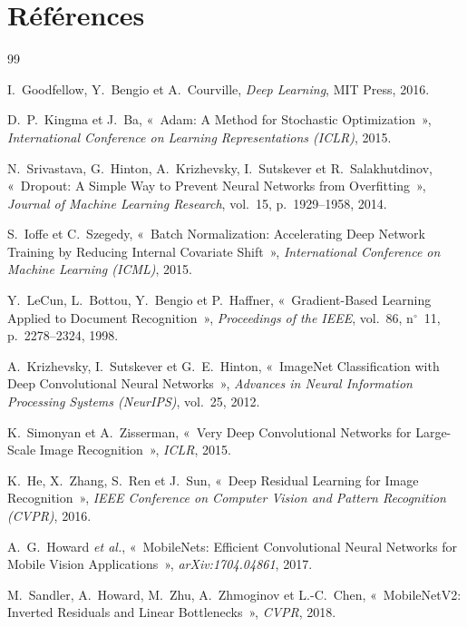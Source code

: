 \chapter*{Références}
\thispagestyle{plain}

\begin{thebibliography}{99}
\small
\setlength{\itemsep}{3pt}

 I.~Goodfellow, Y.~Bengio et A.~Courville, \emph{Deep Learning}, MIT Press, 2016.

 D.~P.~Kingma et J.~Ba, «~Adam: A Method for Stochastic Optimization~», \emph{International Conference on Learning Representations (ICLR)}, 2015.

 N.~Srivastava, G.~Hinton, A.~Krizhevsky, I.~Sutskever et R.~Salakhutdinov, «~Dropout: A Simple Way to Prevent Neural Networks from Overfitting~», \emph{Journal of Machine Learning Research}, vol.~15, p.~1929--1958, 2014.

 S.~Ioffe et C.~Szegedy, «~Batch Normalization: Accelerating Deep Network Training by Reducing Internal Covariate Shift~», \emph{International Conference on Machine Learning (ICML)}, 2015.

 Y.~LeCun, L.~Bottou, Y.~Bengio et P.~Haffner, «~Gradient-Based Learning Applied to Document Recognition~», \emph{Proceedings of the IEEE}, vol.~86, n$^\circ$~11, p.~2278--2324, 1998.

 A.~Krizhevsky, I.~Sutskever et G.~E.~Hinton, «~ImageNet Classification with Deep Convolutional Neural Networks~», \emph{Advances in Neural Information Processing Systems (NeurIPS)}, vol.~25, 2012.

 K.~Simonyan et A.~Zisserman, «~Very Deep Convolutional Networks for Large-Scale Image Recognition~», \emph{ICLR}, 2015.

 K.~He, X.~Zhang, S.~Ren et J.~Sun, «~Deep Residual Learning for Image Recognition~», \emph{IEEE Conference on Computer Vision and Pattern Recognition (CVPR)}, 2016.

 A.~G.~Howard \emph{et al.}, «~MobileNets: Efficient Convolutional Neural Networks for Mobile Vision Applications~», \emph{arXiv:1704.04861}, 2017.

 M.~Sandler, A.~Howard, M.~Zhu, A.~Zhmoginov et L.-C.~Chen, «~MobileNetV2: Inverted Residuals and Linear Bottlenecks~», \emph{CVPR}, 2018.


\end{thebibliography}
